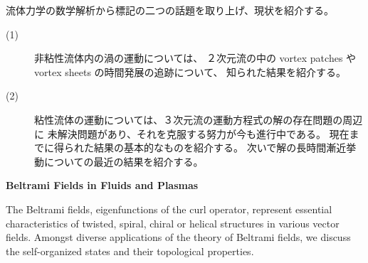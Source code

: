 \documentclass[uplatex,dvipdfmx]{jlreq}
\begin{document}
\bigskip

流体力学の数学解析から標記の二つの話題を取り上げ、現状を紹介する。

\begin{description}
  \item[(1)] 非粘性流体内の渦の運動については、
             ２次元流の中の vortex patches や vortex sheets の時間発展の追跡について、
             知られた結果を紹介する。
  \item[(2)] 粘性流体の運動については、３次元流の運動方程式の解の存在問題の周辺に
             未解決問題があり、それを克服する努力が今も進行中である。
             現在までに得られた結果の基本的なものを紹介する。
             次いで解の長時間漸近挙動についての最近の結果を紹介する。
\end{description}

\newpage

\begin{center}
  {\Large\bfseries Beltrami Fields in Fluids and Plasmas}
\end{center}

\bigskip
\hspace*{\fill}{\large\bfseries 吉田　善章（東大・新領域創成科学研究所）}

\bigskip

The Beltrami fields, eigenfunctions of the curl operator,
represent essential characteristics of twisted, spiral, chiral or helical
structures in various vector fields.
Amongst diverse applications of the theory of Beltrami fields,
we discuss the self-organized states and their topological properties.
\end{document}
